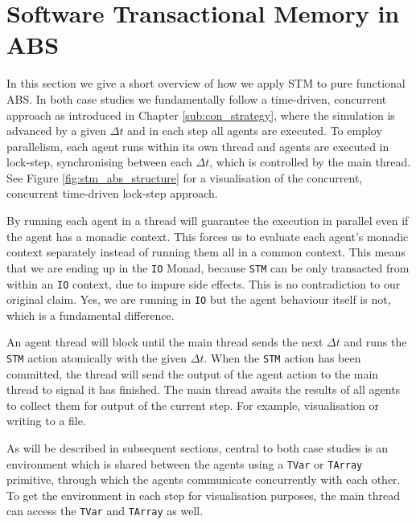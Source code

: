 \section{Software Transactional Memory in ABS}
\label{sec:stm_abs}
In this section we give a short overview of how we apply STM to pure functional ABS. In both case studies we fundamentally follow a time-driven, concurrent approach as introduced in Chapter \ref{sub:con_strategy}, where the simulation is advanced by a given $\Delta t$ and in each step all agents are executed. To employ parallelism, each agent runs within its own thread and agents are executed in lock-step, synchronising between each $\Delta t$, which is controlled by the main thread. See Figure \ref{fig:stm_abs_structure} for a visualisation of the concurrent, concurrent time-driven lock-step approach.

By running each agent in a thread will guarantee the execution in parallel even if the agent has a monadic context. This forces us to evaluate each agent's monadic context separately instead of running them all in a common context. This means that we are ending up in the \texttt{IO} Monad, because \texttt{STM} can be only transacted from within an \texttt{IO} context, due to impure side effects. This is no contradiction to our original claim. Yes, we are running in \texttt{IO} but the agent behaviour itself is not, which is a fundamental difference.

An agent thread will block until the main thread sends the next $\Delta t$ and runs the \texttt{STM} action atomically with the given $\Delta t$. When the \texttt{STM} action has been committed, the thread will send the output of the agent action to the main thread to signal it has finished. The main thread awaits the results of all agents to collect them for output of the current step. For example, visualisation or writing to a file.

As will be described in subsequent sections, central to both case studies is an environment which is shared between the agents using a \texttt{TVar} or \texttt{TArray} primitive, through which the agents communicate concurrently with each other. To get the environment in each step for visualisation purposes, the main thread can access the \texttt{TVar} and \texttt{TArray} as well. 

